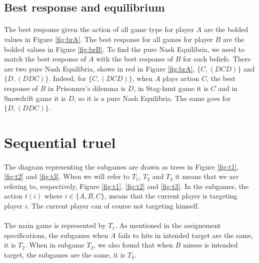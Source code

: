 \documentclass[letterpaper]{article}
\begin{document}
\subsection{Best response and equilibrium}

\paragraph{}

The best response given the action of all game type for player $A$ are
the bolded values in
Figure \ref{fig:brA}. The best response for all games for player $B$ are
the bolded values in
Figure \ref{fig:brB}. To find the pure Nash Equilibria, we need to match
the best response of $A$ with the best response of $B$ for each beliefs. There
are two pure Nash Equilibria, shows in red in Figure \ref{fig:brA},
$\{C, (DCD)\}$ and $\{D, (DDC)\}$. Indeed, for $\{C, (DCD)\}$,
when $A$ plays action $C$, the best
response of $B$ in Prisonner's dilemma is $D$, in Stag-hunt game it is $C$ and
in Snowdrift game it is $D$, so it is a pure Nash Equilibria. The same
goes for $\{D, (DDC)\}$.

\section{Sequential truel}

\paragraph{}

The diagram representing the subgames are drawn as trees in
Figure \ref{fig:t1}, \ref{fig:t2} and \ref{fig:t3}. When we will refer to $T_1$,
$T_2$ and $T_3$ it means that we are refering to, respectively,
Figure \ref{fig:t1}, \ref{fig:t2} and \ref{fig:t3}. In the subgames,
the action $t(i)$ where $i \in \{A, B, C\}$, means that the current player
is targeting player $i$. The current player can of course not targeting himself.

\paragraph{}

The main game is represented by
$T_1$. As mentioned in the
assignement specifications, the subgames when $A$ fails to hits in intended
target are the same,  it is $T_2$. When in subgame $T_2$, we also found
that when $B$ misses is intended target, the subgames are the same, it is $T_3$.
\end{document}
